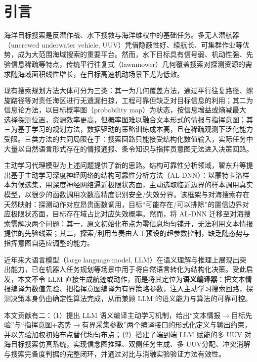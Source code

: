 \documentclass[a4paper,UTF8,zihao=5,twocolumn]{ctexart}
\numberwithin{equation}{section}
\begin{document}
\section*{\sffamily\bfseries 引\quad 言}

海洋目标搜索是反潜作战、水下搜救与海洋维权中的基础任务。多无人潜航器（uncrewed underwater vehicle, UUV）凭借隐蔽性好、续航长、可集群作业等优势，成为大范围海域搜索的重要平台\cite{ref1,ref2,ref19,ref20}。然而，水下目标具有信号弱、机动性强、先验信息稀疏等特点，传统平行往复式（lawnmower）几何覆盖搜索对探测资源的需求随海域面积线性增长，在目标高速机动场景下尤为低效。

现有搜索规划方法大体可分为三类：其一为几何覆盖方法\cite{ref3,ref4}，通过平行往复路径、螺旋路径等对责任海区进行无遗漏扫掠，工程可靠但缺乏对目标信息的利用；其二为信息论方法\cite{ref5,ref6,ref18,ref23}，以目标概率图（probability map）为状态，按信息增益或熵减最大选择探测位置，资源效率更高，但概率图难以融合文本形式的情报与指挥意图；其三为基于学习的规划方法\cite{ref7,ref8}，数据驱动的策略训练成本高，且在稀疏观测下泛化能力受限。三类方法的共同局限在于：搜索回路只能接受结构化数值输入，实际任务中大量以自然语言形式存在的情报通报、条令知识与指挥员意图无法进入决策回路。

主动学习代理模型为上述问题提供了新的思路\cite{ref14,ref15,ref16,ref17}。结构可靠性分析领域，翟东升等\cite{ref9}提出基于主动学习深度神经网络的结构可靠性分析方法（AL-DNN）：以蒙特卡洛样本为候选集，用深度神经网络逼近极限状态面，主动选取临近边界的样本调用真实模型，以很少的函数调用次数高精度识别安全/失效分界。该框架与对海搜索存在天然映射：探测动作对应昂贵函数调用，目标“可能存在/可以排除”的置信边界对应极限状态面，目标存在域占比对应失效概率。然而，将 AL-DNN 迁移至对海搜索需解决两个问题：其一，原文初始化布点为零信息均匀铺开，无法利用文本情报提供的先验线索；其二，探索/利用节奏由人工预设的超参数控制，缺乏随态势与指挥意图自适应调整的能力。

近年来大语言模型（large language model, LLM）在语义理解与推理上展现出突出能力\cite{ref10,ref11,ref24}，已在机器人任务规划\cite{ref12,ref13}等场景中用于将自然语言转化为结构化决策。受此启发，本文不令 LLM 直接生成航迹或动作，而是将其定位为\textbf{语义编译器}：把文本情报编译为数值先验、把指挥意图编译为有界策略参数，注入主动学习搜索回路，探测决策本身仍由确定性算法完成，从而兼顾 LLM 的语义能力与算法的可靠可控。

本文贡献有二：（1）提出 LLM 语义编译主动学习机制，给出“文本情报$\to$目标先验”与“指挥意图+态势$\to$有界采集参数”两个编译接口的形式化定义与输出约束，并以先验加权初始布点替代均匀布点；（2）搭建了端到端 LLM 赋能的多 UUV 对海目标搜索仿真系统，实现信念图推理、双侧任务生成、多 UUV分配、冲突消解与搜索完备度判据的完整闭环，并通过对比与消融实验验证方法有效性。
\end{document}
